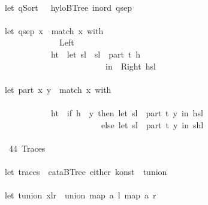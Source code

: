 \documentclass[a4paper]{article}
\begin{document}
\begin{tabbing}
\ttfamily ~\\
\ttfamily ~let~qSort~~~hyloBTree~inord~qsep\\
\ttfamily ~\\
\ttfamily ~let~qsep~x~~match~x~with\\
\ttfamily ~~~~~~~~~~~~~~Left~\\
\ttfamily ~~~~~~~~~~~~ht~~let~sl~~sl~~part~t~h\\
\ttfamily ~~~~~~~~~~~~~~~~~~~~~~~~~in~~Right~hsl\\
\ttfamily ~~~~~~~~~~~~~~~~~~~~~~\\
\ttfamily ~let~part~x~y~~match~x~with\\
\ttfamily ~~~~~~~~~~~~~~\\
\ttfamily ~~~~~~~~~~~~ht~~if~h~~y~then~let~sl~~part~t~y~in~hsl\\
\ttfamily ~~~~~~~~~~~~~~~~~~~~~~~~else~let~sl~~part~t~y~in~shl\\
\ttfamily ~\\
\ttfamily ~~44~Traces~\\
\ttfamily ~\\
\ttfamily ~let~traces~~cataBTree~either~konst~~tunion\\
\ttfamily ~\\
\ttfamily ~let~tunion~xlr~~union~map~a~l~map~a~r\\

\end{tabbing}
\end{document}
